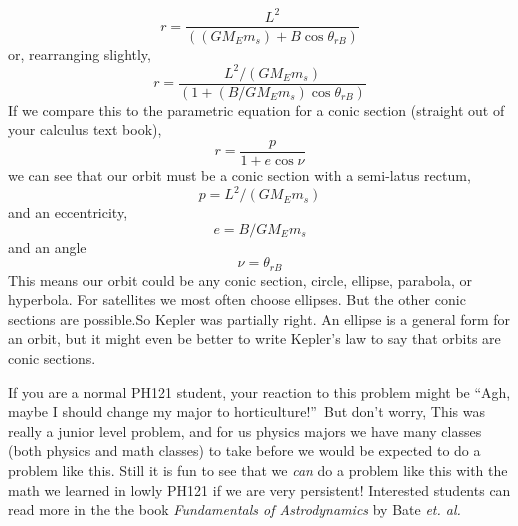 $$r=\frac{L^{2}}{\left( \left( GM_{E}m_{s}\right) +B\cos \theta _{rB}\right) } 
$$
or, rearranging slightly, 
$$r=\frac{L^{2}/\left( GM_{E}m_{s}\right) }{\left( 1+\left(B/GM_{E}m_{s}\right) \cos \theta _{rB}\right) } $$
If we compare this to the parametric equation for a conic section (straight out of your calculus text book), 
$$r=\frac{p}{1+e\cos \nu } $$
we can see that our orbit must be a conic section with a semi-latus rectum, 
$$p=L^{2}/\left( GM_{E}m_{s}\right) $$
and an eccentricity, 
$$e=B/GM_{E}m_{s}$$
and an angle 
$$\nu =\theta _{rB}$$
This means our orbit could be any conic section, circle, ellipse, parabola, or hyperbola. For satellites we most often choose ellipses. But the other conic sections are possible.So Kepler was partially right. An ellipse is a general form for an orbit, but it might even be better to write Kepler's law to say that orbits are conic sections.

If you are a normal PH121 student, your reaction to this problem might be \textquotedblleft Agh, maybe I should change my major to horticulture!\textquotedblright\ But don't worry, This was really a junior level problem, and for us physics majors we have many classes (both physics and math classes) to take before we would be expected to do a problem like this. Still it is fun to see that we \emph{can} do a problem like this with the math we learned in lowly PH121 if we are very persistent!  Interested students can read more in the the book \textit{Fundamentals of Astrodynamics} by Bate \textit{et. al.} \cite{Bate1971}\cite{ExplainingComputers2021}\cite{byuiphysics}\cite{Acquista76}
	
